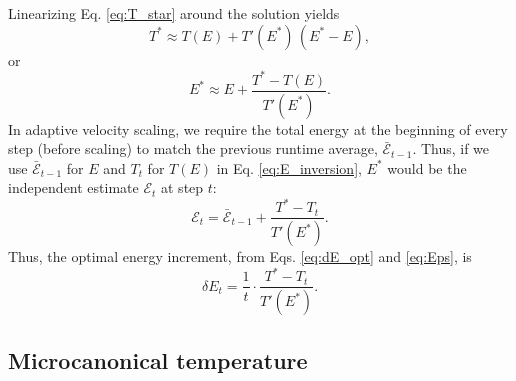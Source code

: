\documentclass[reprint]{revtex4-1}
\begin{document}
Linearizing Eq. \eqref{eq:T_star} around the solution
yields
%
\begin{equation*}
T^*
\approx
T( E )
+
T'( E^* ) \, ( E^* - E )
,
\end{equation*}
%
or
%
\begin{equation}
E^*
\approx
E
+
\frac{ T^* - T(E) }
     { T'(E^*) }
.
\label{eq:E_inversion}
\end{equation}
%
In adaptive velocity scaling,
we require the total energy at the beginning of every step
(before scaling) to match the previous runtime average,
$\bar{\mathcal E}_{t - 1}$.
%
Thus, if we use $\bar{\mathcal E}_{t - 1}$ for $E$
and $T_t$ for $T(E)$
in Eq. \eqref{eq:E_inversion},
$E^*$ would be the independent estimate
$\mathcal E_{t}$ at step $t$:
%
%
\begin{equation}
\mathcal E_t
=
\bar{\mathcal E}_{t - 1}
+
\frac{ T^* - T_t }
     { T'(E^*) }
.
\label{eq:Eps}
\end{equation}
%
Thus, the optimal energy increment,
from Eqs. \eqref{eq:dE_opt} and \eqref{eq:Eps},
is
%
\begin{equation}
\delta E_t
=
\frac{ 1 } { t }
\cdot
\frac{ T^* - T_t }
     { T'(E^*) }
.
\label{eq:dE_T}
\end{equation}
%



\subsection{Microcanonical temperature}
\end{document}
